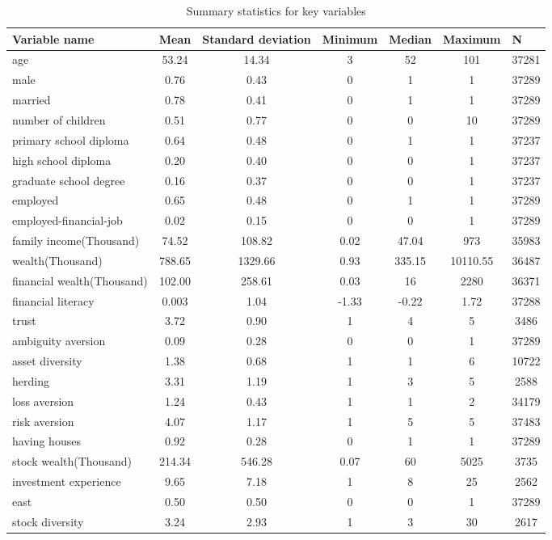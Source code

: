 \documentclass[ukenglish,nottitlepage,thmsb,11pt,letterpaper]{article}
\begin{document}
\begin{spacing}{1}
\begin{table}[H]
	\renewcommand\arraystretch{1.5}%
	\centering
	\caption{Summary statistics for key variables } 
	\small
	\begin{tabular*}{\textwidth}{l @{\extracolsep{\fill}} cccccc}
		\toprule
		Variable name  & \multicolumn{1}{l}{Mean} & \multicolumn{1}{l}{Standard deviation} & \multicolumn{1}{l}{Minimum } & \multicolumn{1}{l}{Median} & \multicolumn{1}{l}{Maximum} & \multicolumn{1}{l}{N} \\
		\midrule
		age                     &53.24  &14.34  &3  &52  &101 &37281\\
		male                    &0.76   &0.43   &0  &1   &1   &37289 \\
		married                 &0.78   &0.41   &0  &1   &1   &37289 \\
		number of children      &0.51   &0.77   &0  &0   &10  &37289 \\
		primary school diploma  &0.64   &0.48   &0  &1   &1   &37237 \\
		high school diploma     &0.20   &0.40   &0  &0   &1   &37237 \\
		graduate school degree  &0.16   &0.37   &0  &0   &1   &37237 \\
		employed                &0.65   &0.48   &0  &1   &1   &37289 \\
		employed-financial-job  &0.02   &0.15   &0  &0   &1   &37289 \\
		family income(Thousand) &74.52  &108.82  &0.02  &47.04  &973 &35983 \\
		wealth(Thousand)        &788.65 &1329.66 &0.93  &335.15 &10110.55 &36487 \\
		financial wealth(Thousand) &102.00 &258.61 &0.03 &16 &2280 &36371 \\
		financial literacy      &0.003 &1.04 &-1.33 &-0.22 &1.72 &37288 \\
		trust                   &3.72 &0.90 &1       &4      &5      &3486  \\
		ambiguity aversion      &0.09 &0.28 &0       &0      &1      &37289 \\
		asset diversity         &1.38 &0.68 &1       &1      &6      &10722 \\
		herding                 &3.31 &1.19 &1       &3      &5      &2588 \\
		loss aversion           &1.24 &0.43 &1       &1      &2      &34179\\
		risk aversion           &4.07 &1.17 &1       &5      &5      &37483 \\
		having houses           &0.92 &0.28 &0       &1      &1      &37289\\
		stock wealth(Thousand)  &214.34 &546.28 &0.07   &60 &5025    &3735 \\
		investment experience   &9.65   &7.18   &1   &8   &25        &2562 \\
		east                    &0.50   &0.50   &0   &0  &1          &37289 \\
		stock diversity         &3.24   &2.93   &1   &3  &30  &2617 \\
		\bottomrule
		

\end{tabular*}
\end{table}
\end{spacing}
\end{document}
